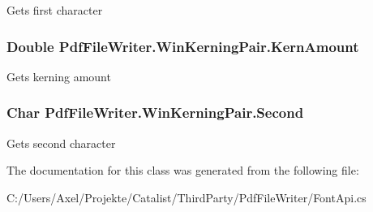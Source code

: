 Gets first character 

\subsubsection[{\texorpdfstring{Kern\+Amount}{KernAmount}}]{\setlength{\rightskip}{0pt plus 5cm}Double Pdf\+File\+Writer.\+Win\+Kerning\+Pair.\+Kern\+Amount\hspace{0.3cm}{\ttfamily [get]}}\hypertarget{class_pdf_file_writer_1_1_win_kerning_pair_aa2f11f6ef339efb987e7011adbd469b5}{}\label{class_pdf_file_writer_1_1_win_kerning_pair_aa2f11f6ef339efb987e7011adbd469b5}


Gets kerning amount 

\subsubsection[{\texorpdfstring{Second}{Second}}]{\setlength{\rightskip}{0pt plus 5cm}Char Pdf\+File\+Writer.\+Win\+Kerning\+Pair.\+Second\hspace{0.3cm}{\ttfamily [get]}}\hypertarget{class_pdf_file_writer_1_1_win_kerning_pair_aa9993861b118f4511b96654bb209f6b3}{}\label{class_pdf_file_writer_1_1_win_kerning_pair_aa9993861b118f4511b96654bb209f6b3}


Gets second character 



The documentation for this class was generated from the following file\+:\begin{DoxyCompactItemize}
\item 
C\+:/\+Users/\+Axel/\+Projekte/\+Catalist/\+Third\+Party/\+Pdf\+File\+Writer/Font\+Api.\+cs\end{DoxyCompactItemize}
